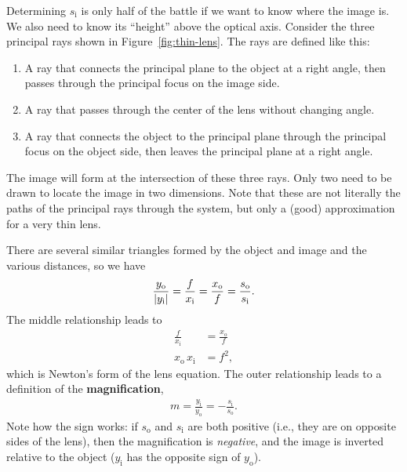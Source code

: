 \documentclass[]{manual}
\begin{document}
    Determining $s_{\mathrm{i}}$ is only half of the battle if we want to know where the image is.
    We also need to know its ``height'' above the optical axis.
    Consider the three principal rays shown in Figure~\ref{fig:thin-lens}.
    The rays are defined like this:
    \begin{enumerate}
        \item A ray that connects the principal plane to the object at a right angle, then passes through the principal focus on the image side.
        \item A ray that passes through the center of the lens without changing angle.
        \item A ray that connects the object to the principal plane through the principal focus on the object side, then leaves the principal plane at a right angle.
    \end{enumerate}
    The image will form at the intersection of these three rays.
    Only two need to be drawn to locate the image in two dimensions.
    Note that these are not literally the paths of the principal rays through the system, but only a (good) approximation for a very thin lens.

    There are several similar triangles formed by the object and image and the various distances, so we have
    \begin{align}
        \frac{y_{\mathrm{o}}}{\abs{y_{\mathrm{i}}}} = \frac{f}{x_{\mathrm{i}}} = \frac{x_{\mathrm{o}}}{f} = \frac{s_{\mathrm{o}}}{s_{\mathrm{i}}}.
    \end{align}
    The middle relationship leads to
    \begin{align}
        \frac{f}{x_{\mathrm{i}}} &= \frac{x_{\mathrm{o}}}{f} \nonumber \\
        x_{\mathrm{o}} \, x_{\mathrm{i}} &= f^2,
    \end{align}
    which is Newton's form of the lens equation.
    The outer relationship leads to a definition of the \textbf{magnification},
    \begin{align} \label{eqn:magnification}
        m = \frac{y_{\mathrm{i}}}{y_{\mathrm{o}}} = - \frac{s_{\mathrm{i}}}{s_{\mathrm{o}}}.
    \end{align}
    Note how the sign works: if $s_{\mathrm{o}}$ and $s_{\mathrm{i}}$ are both positive (i.e., they are on opposite sides of the lens), then the magnification is \textit{negative}, and the image is inverted relative to the object ($y_{\mathrm{i}}$ has the opposite sign of $y_{\mathrm{o}}$).
\end{document}
